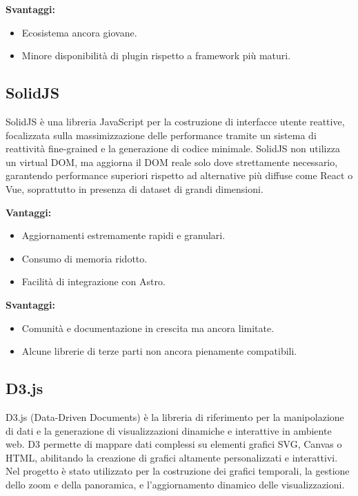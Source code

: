 \textbf{Svantaggi:}
\begin{itemize}
    \item Ecosistema ancora giovane.
    \item Minore disponibilità di plugin rispetto a framework più maturi.
\end{itemize}

\subsection{SolidJS}

SolidJS è una libreria JavaScript per la costruzione di interfacce utente reattive, focalizzata sulla massimizzazione delle performance tramite un sistema di reattività fine-grained e la generazione di codice minimale. SolidJS non utilizza un virtual DOM, ma aggiorna il DOM reale solo dove strettamente necessario, garantendo performance superiori rispetto ad alternative più diffuse come React o Vue, soprattutto in presenza di dataset di grandi dimensioni.

\textbf{Vantaggi:}
\begin{itemize}
    \item Aggiornamenti estremamente rapidi e granulari.
    \item Consumo di memoria ridotto.
    \item Facilità di integrazione con Astro.
\end{itemize}

\textbf{Svantaggi:}
\begin{itemize}
    \item Comunità e documentazione in crescita ma ancora limitate.
    \item Alcune librerie di terze parti non ancora pienamente compatibili.
\end{itemize}

\subsection{D3.js}

D3.js (Data-Driven Documents) è la libreria di riferimento per la manipolazione di dati e la generazione di visualizzazioni dinamiche e interattive in ambiente web. D3 permette di mappare dati complessi su elementi grafici SVG, Canvas o HTML, abilitando la creazione di grafici altamente personalizzati e interattivi. Nel progetto è stato utilizzato per la costruzione dei grafici temporali, la gestione dello zoom e della panoramica, e l’aggiornamento dinamico delle visualizzazioni.

